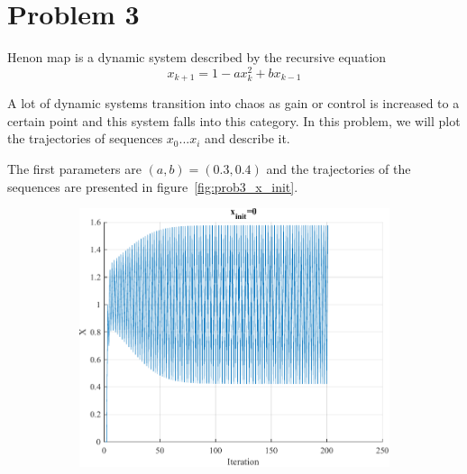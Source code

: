 \section{Problem 3}

Henon map is a dynamic system described by the recursive equation 
\[
x_{k+1} = 1 - ax^2_k + bx_{k-1}
\]

A lot of dynamic systems transition into chaos as gain or control is increased to a certain point and this system falls into this category.
In this problem, we will plot the trajectories of sequences $x_0 ... x_i$ and describe it.

The first parameters are $(a,b) = (0.3, 0.4)$ and the trajectories of the sequences are presented in figure~\ref{fig:prob3_x_init}.

\begin{figure}[htpb]
	\centering
	\begin{subfigure}{.47\textwidth}
		\centering
		\includegraphics[width=\textwidth]{../Problem 3/prob3_x_init_0.pdf}
		\caption{}
	\end{subfigure}
	\hspace{1mm}
	\begin{subfigure}{.47\textwidth}
		\centering

\end{subfigure}
\end{figure}
